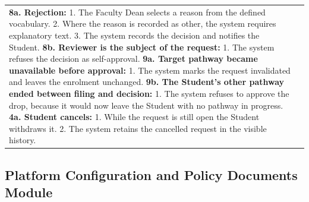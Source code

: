 \begin{longtable}{|>{\raggedright\arraybackslash}p{}|>{\raggedright\arraybackslash}p{}|}
\textbf{8a. Rejection:} \newline
\hspace*{1em}1. The Faculty Dean selects a reason from the defined vocabulary. \newline
\hspace*{1em}2. Where the reason is recorded as other, the system requires explanatory text. \newline
\hspace*{1em}3. The system records the decision and notifies the Student. \newline
\textbf{8b. Reviewer is the subject of the request:} \newline
\hspace*{1em}1. The system refuses the decision as self-approval. \newline
\textbf{9a. Target pathway became unavailable before approval:} \newline
\hspace*{1em}1. The system marks the request invalidated and leaves the enrolment unchanged. \newline
\textbf{9b. The Student's other pathway ended between filing and decision:} \newline
\hspace*{1em}1. The system refuses to approve the drop, because it would now leave the Student with no pathway in progress. \newline
\textbf{4a. Student cancels:} \newline
\hspace*{1em}1. While the request is still open the Student withdraws it. \newline
\hspace*{1em}2. The system retains the cancelled request in the visible history. \\
\end{longtable}


\subsection{Platform Configuration and Policy Documents Module}

